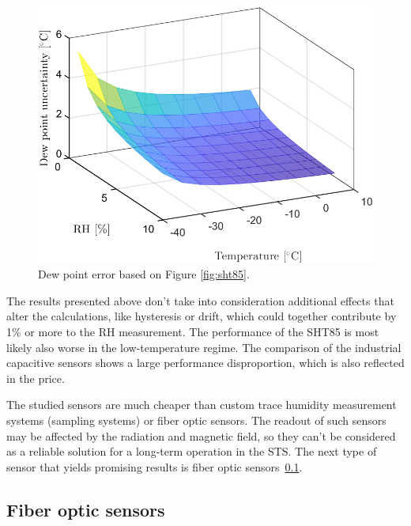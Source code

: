\begin{figure}[!h]
\centering
\includegraphics[width=0.6\columnwidth]{Chapter5/images/SHTRH15T02.png}
\caption{Dew point error based on Figure \ref{fig:sht85}.}
\label{fig:sht85_dp}
\end{figure}
\newpage
The results presented above don't take into consideration additional effects that alter the calculations, like hysteresis or drift, which could together contribute by 1\% or more to the \gls{RH} measurement. The performance of the SHT85 is most likely also worse in the low-temperature regime. The comparison of the industrial capacitive sensors shows a large performance disproportion, which is also reflected in the price.

The studied sensors are much cheaper than custom trace humidity measurement systems (sampling systems) or fiber optic sensors. The readout of such sensors may be affected by the radiation and magnetic field, so they can't be considered as a reliable solution for a long-term operation in the \gls{STS}. The next type of sensor that yields promising results is fiber optic sensors~\ref{FOS}.

\subsection{Fiber optic sensors}
\label{FOS}

